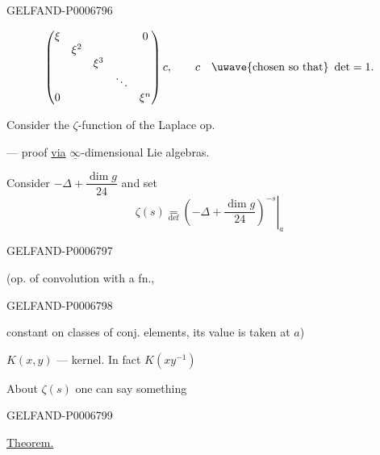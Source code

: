 \begin{GelfandAdjacentEvidence}{GELFAND-P000679}{6}

\[
\begin{pmatrix}
 \xi&&&&0\\
 &\xi^2&&&\\
 &&\xi^3&&\\
 &&&\ddots&\\
 0&&&&\xi^n
\end{pmatrix}c,\qquad c\quad \text{\uwave{chosen so that} }\det=1.
\]

Consider the \(\zeta\)-function of the Laplace op.

 --- proof \underline{via}
\(\underline{\infty}\)-dimensional Lie algebras.

Consider \(-\Delta+\dfrac{\dim g}{24}\) and set
\[
\zeta(s)\underset{\mathrm{def}}{=}
\left.\left(-\Delta+\frac{\dim g}{24}\right)^{-s}\right|_a
\]
\end{GelfandAdjacentEvidence}
\begin{GelfandAdjacentEvidence}{GELFAND-P000679}{7}

(op. of convolution with a fn.,
\end{GelfandAdjacentEvidence}
\begin{GelfandAdjacentEvidence}{GELFAND-P000679}{8}

constant on classes of conj. elements,
its value is taken at \(a\))

\(K(x,y)\) --- kernel. In fact \(K(xy^{-1})\)

About \sout{\(\zeta(s)\)} one can say something
\end{GelfandAdjacentEvidence}
\begin{GelfandAdjacentEvidence}{GELFAND-P000679}{9}


\underline{Theorem.}
\end{GelfandAdjacentEvidence}

